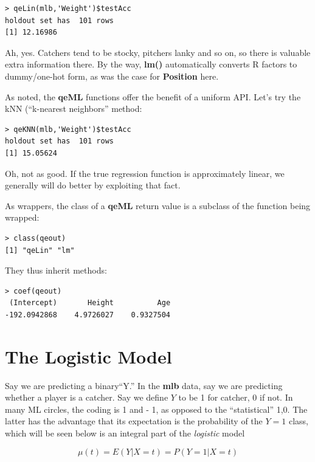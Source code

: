 \begin{lstlisting}
> qeLin(mlb,'Weight')$testAcc
holdout set has  101 rows
[1] 12.16986
\end{lstlisting}

Ah, yes.  Catchers tend to be stocky, pitchers lanky and so on, so there
is valuable extra information there.  By the way, \textbf{lm()}
automatically converts R factors to dummy/one-hot form, as was the case
for \textbf{Position} here.

As noted, the \textbf{qeML} functions offer the benefit of a uniform
API.  Let's try the kNN (``k-nearest neighbors'' method:

\begin{lstlisting}
> qeKNN(mlb,'Weight')$testAcc
holdout set has  101 rows
[1] 15.05624
\end{lstlisting}

Oh, not as good.  If the true regression function is approximately
linear, we generally will do better by exploiting that fact.

As wrappers, the class of a \textbf{qeML} return value is a subclass of
the function being wrapped:

\begin{lstlisting}
> class(qeout)
[1] "qeLin" "lm"   
\end{lstlisting}

They thus inherit methods:

\begin{lstlisting}
> coef(qeout)
 (Intercept)       Height          Age 
-192.0942868    4.9726027    0.9327504 
\end{lstlisting}

\section{The Logistic Model}

Say we are predicting a binary``Y.''  In the \textbf{mlb} data, say we
are predicting whether a player is a catcher.  Say we define $Y$ to be 1
for catcher, 0 if not.  In many ML circles, the coding is 1 and - 1, as
opposed to the ``statistical'' 1,0.  The latter has the advantage that
its expectation is the probability of the $Y = 1$ class, which will be
seen below is an integral part of the \textit{logistic} model

\begin{equation}
\mu(t) = E(Y | X= t) = P(Y = 1 | X = t)
\end{equation}

